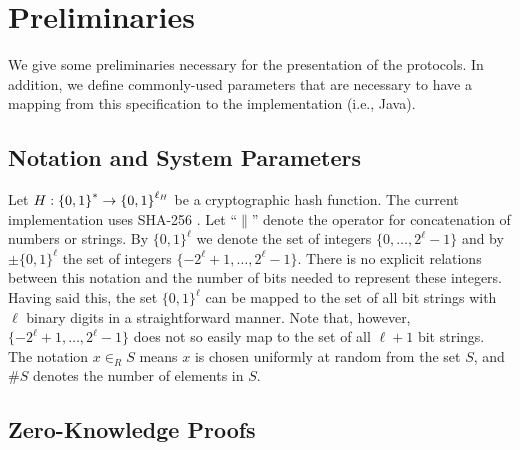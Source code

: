 
\section{Preliminaries}
\label{sec:prelim}

We give some preliminaries necessary for the presentation of the protocols.
In addition, we define commonly-used parameters that
are necessary to have a mapping from this specification to the implementation 
(i.e., Java).

 
\subsection{Notation and System Parameters}
\label{sec:parameters}

Let $H: \left\{ 0,1 \right\}^* \to \left\{ 0,1 \right\}^{\ell_{H}}$ be a cryptographic hash function.
The current implementation uses SHA-256 \cite{nist93}. 
Let ``$\|$'' denote the operator for concatenation of numbers or strings.
By $\{0,1\}^\ell$ we denote the set of integers $\{0, \ldots, 2^\ell -1 \}$ and by
$\pm \{0,1\}^\ell$ the set of integers $\{- 2^\ell + 1, \ldots, 2^\ell -1 \}$.
There is no explicit relations between this notation and the number of bits
needed to represent these integers.
Having said this, the set $\{0,1\}^\ell$ can be mapped to the set of all bit
strings with $\ell$ binary digits in a straightforward manner.  Note that,
however,  $\{- 2^\ell + 1, \ldots, 2^\ell -1 \}$ does not so easily map to the set
of all $\ell+1$ bit strings.  The notation $x \in_R S$ means $x$ is chosen
uniformly at random from the set $S$, and $\#S$ denotes the number of elements
in $S$.


\subsection{Zero-Knowledge Proofs}

